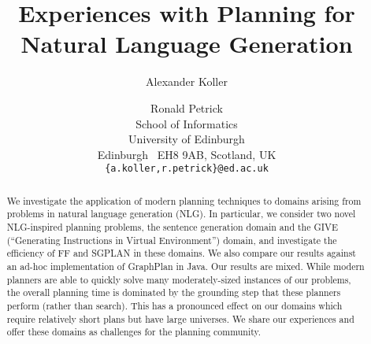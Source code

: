 \documentclass[letterpaper]{article}
\title{Experiences with Planning for Natural Language Generation}
\author{Alexander Koller \and Ronald Petrick \\
School of Informatics \\
University of Edinburgh \\
Edinburgh \ EH8 9AB, Scotland, UK \\
\texttt{\{a.koller,r.petrick\}@ed.ac.uk}}
\begin{document}
\maketitle


\begin{abstract}
We investigate the application of modern planning techniques to domains
arising from problems in natural language generation (NLG). In particular,
we consider two novel NLG-inspired planning problems, the sentence
generation domain and the GIVE (``Generating Instructions in Virtual
Environment'') domain, and investigate the efficiency of FF and SGPLAN in
these domains. We also compare our results against an ad-hoc implementation
of GraphPlan in Java. Our results are mixed. While modern planners are able
to quickly solve many moderately-sized instances of our problems, the
overall planning time is dominated by the grounding step that these
planners perform (rather than search). This has a pronounced effect on our
domains which require relatively short plans but have large universes. We
share our experiences and offer these domains as challenges for the
planning community.  \end{abstract}











\end{document}
